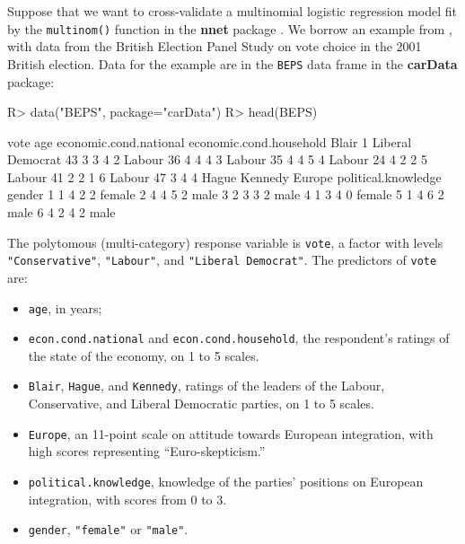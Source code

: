\documentclass[
]{jss}
\providecommand{\tightlist}{%
  \setlength{\itemsep}{0pt}\setlength{\parskip}{0pt}}
\begin{document}
Suppose that we want to cross-validate a multinomial logistic regression
model fit by the \texttt{multinom()} function in the \textbf{nnet}
package \citep{VenablesRipley:2002}. We borrow an example from
\citet[Sec. 14.2.1]{Fox:2016}, with data from the British Election Panel
Study on vote choice in the 2001 British election. Data for the example
are in the \texttt{BEPS} data frame in the \textbf{carData} package:

\begin{CodeChunk}
\begin{CodeInput}
R> data("BEPS", package="carData")
R> head(BEPS)
\end{CodeInput}
\begin{CodeOutput}
              vote age economic.cond.national economic.cond.household Blair
1 Liberal Democrat  43                      3                       3     4
2           Labour  36                      4                       4     4
3           Labour  35                      4                       4     5
4           Labour  24                      4                       2     2
5           Labour  41                      2                       2     1
6           Labour  47                      3                       4     4
  Hague Kennedy Europe political.knowledge gender
1     1       4      2                   2 female
2     4       4      5                   2   male
3     2       3      3                   2   male
4     1       3      4                   0 female
5     1       4      6                   2   male
6     4       2      4                   2   male
\end{CodeOutput}
\end{CodeChunk}

The polytomous (multi-category) response variable is \texttt{vote}, a
factor with levels \texttt{"Conservative"}, \texttt{"Labour"}, and
\texttt{"Liberal\ Democrat"}. The predictors of \texttt{vote} are:

\begin{itemize}
\tightlist
\item
  \texttt{age}, in years;
\item
  \texttt{econ.cond.national} and \texttt{econ.cond.household}, the
  respondent's ratings of the state of the economy, on 1 to 5 scales.
\item
  \texttt{Blair}, \texttt{Hague}, and \texttt{Kennedy}, ratings of the
  leaders of the Labour, Conservative, and Liberal Democratic parties,
  on 1 to 5 scales.
\item
  \texttt{Europe}, an 11-point scale on attitude towards European
  integration, with high scores representing ``Euro-skepticism.''
\item
  \texttt{political.knowledge}, knowledge of the parties' positions on
  European integration, with scores from 0 to 3.
\item
  \texttt{gender}, \texttt{"female"} or \texttt{"male"}.
\end{itemize}
\end{document}
